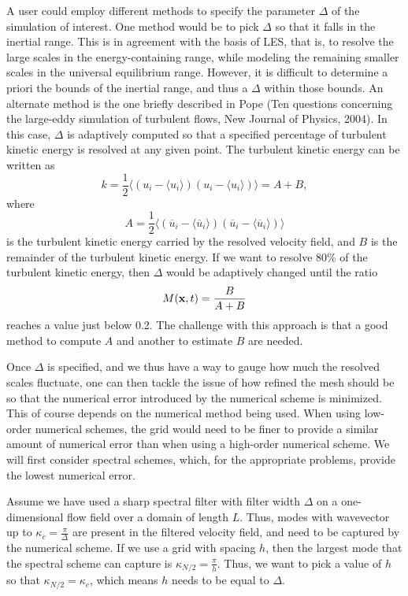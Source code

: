 \documentclass[oneside,a4paper,11pt]{report}
\newcommand{\ures}{\overline{u}}
\begin{document}
A user could employ different methods to specify the parameter $\Delta$ of the simulation of interest. One method would be to pick $\Delta$ so that it falls in the inertial range. This is in agreement with the basis of LES, that is, to resolve the large scales in the energy-containing range, while modeling the remaining smaller scales in the universal equilibrium range. However, it is difficult to determine a priori the bounds of the inertial range, and thus a $\Delta$ within those bounds. An alternate method is the one briefly described in Pope (Ten questions concerning the large-eddy simulation of turbulent flows, New Journal of Physics, 2004). In this case, $\Delta$ is adaptively computed so that a specified percentage of turbulent kinetic energy is resolved at any given point. The turbulent kinetic energy can be written as
\begin{equation}
    k=\frac{1}{2} \langle (u_i - \langle u_i \rangle) (u_i - \langle u_i \rangle) \rangle = A + B,
\end{equation}
where 
\begin{equation}
    A = \frac{1}{2}  \langle (\ures_i - \langle \ures_i \rangle) (\ures_i - \langle \ures_i \rangle) \rangle
\end{equation}
is the turbulent kinetic energy carried by the resolved velocity field, and $B$ is the remainder of the turbulent kinetic energy. If we want to resolve 80\% of the turbulent kinetic energy, then $\Delta$ would be adaptively changed until the ratio
\begin{equation}
M(\mathbf{x},t) = \frac{B}{A+B}
\end{equation}
reaches a value just below 0.2. The challenge with this approach is that a good method to compute $A$ and another to estimate $B$ are needed.

Once $\Delta$ is specified, and we thus have a way to gauge how much the resolved scales fluctuate, one can then tackle the issue of how refined the mesh should be so that the numerical error introduced by the numerical scheme is minimized. This of course depends on the numerical method being used. When using low-order numerical schemes, the grid would need to be finer to provide a similar amount of numerical error than when using a high-order numerical scheme. We will first consider spectral schemes, which, for the appropriate problems, provide the lowest numerical error. 

Assume we have used a sharp spectral filter with filter width $\Delta$ on a one-dimensional flow field over a domain of length $L$. Thus, modes with wavevector up to $\kappa_c = \frac{\pi}{\Delta}$ are present in the filtered velocity field, and need to be captured by the numerical scheme. If we use a grid with spacing $h$, then the largest mode that the spectral scheme can capture is $\kappa_{N/2} = \frac{\pi}{h}$. Thus, we want to pick a value of $h$ so that $\kappa_{N/2}=\kappa_c$, which means $h$ needs to be equal to $\Delta$.
\end{document}
